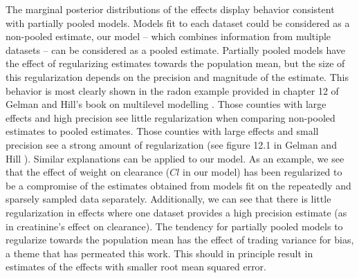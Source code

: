 The marginal posterior distributions of the effects display behavior consistent with partially pooled models.  Models fit to each dataset could be considered as a non-pooled estimate, our model -- which combines information from multiple datasets -- can be considered as a pooled estimate.  Partially pooled models have the effect of regularizing estimates towards the population mean, but the size of this regularization depends on the precision and magnitude of the estimate. This behavior is most clearly shown in the radon example provided in chapter 12 of Gelman and Hill's book on multilevel modelling \cite{gelman2006data}. Those counties with large effects and high precision see little regularization when comparing non-pooled estimates to pooled estimates.  Those counties with large effects and small precision see a strong amount of regularization (see figure 12.1 in  Gelman and Hill \cite{gelman2006data}). Similar explanations can be applied to our model.  As an example, we see that the effect of weight on clearance ($Cl$ in our model) has been regularized to be a compromise of the estimates obtained from models fit on the repeatedly and sparsely sampled data separately.  Additionally, we can see that there is little regularization in effects where one dataset provides a high precision estimate (as in creatinine's effect on clearance). The tendency for partially pooled models to regularize towards the population mean has the effect of trading variance for bias, a theme that has permeated this work.  This should in principle result in estimates of the effects with smaller root mean squared error.

